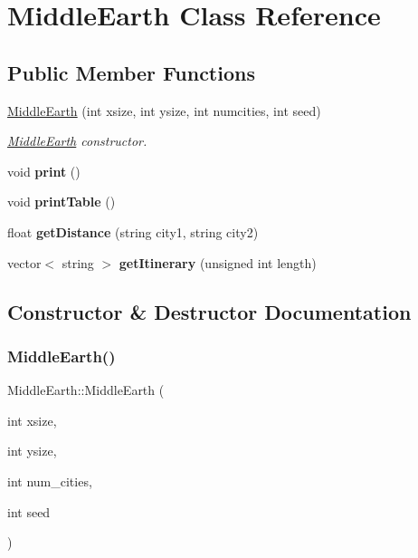 \hypertarget{class_middle_earth}{}\section{Middle\+Earth Class Reference}
\label{class_middle_earth}
\subsection*{Public Member Functions}
\begin{DoxyCompactItemize}
\item 
\hyperlink{class_middle_earth_ab7f5e0c9a33827812f435042e41e7800}{Middle\+Earth} (int xsize, int ysize, int numcities, int seed)
\begin{DoxyCompactList}\small\item\em \hyperlink{class_middle_earth}{Middle\+Earth} constructor. \end{DoxyCompactList}\item 
\hypertarget{class_middle_earth_a5cb0956acbe5e39525e5061c9f3cc79b}{}\label{class_middle_earth_a5cb0956acbe5e39525e5061c9f3cc79b} 
void {\bfseries print} ()
\item 
\hypertarget{class_middle_earth_ae724794944d0ade7854047e779eb7054}{}\label{class_middle_earth_ae724794944d0ade7854047e779eb7054} 
void {\bfseries print\+Table} ()
\item 
\hypertarget{class_middle_earth_af558c23fd240638847105737faf755a3}{}\label{class_middle_earth_af558c23fd240638847105737faf755a3} 
float {\bfseries get\+Distance} (string city1, string city2)
\item 
\hypertarget{class_middle_earth_ad730d037c3946ec1129657fc5e0cb353}{}\label{class_middle_earth_ad730d037c3946ec1129657fc5e0cb353} 
vector$<$ string $>$ {\bfseries get\+Itinerary} (unsigned int length)
\end{DoxyCompactItemize}


\subsection{Constructor \& Destructor Documentation}
\hypertarget{class_middle_earth_ab7f5e0c9a33827812f435042e41e7800}{}\label{class_middle_earth_ab7f5e0c9a33827812f435042e41e7800} 
\subsubsection{\texorpdfstring{Middle\+Earth()}{MiddleEarth()}}
{\footnotesize\ttfamily Middle\+Earth\+::\+Middle\+Earth (\begin{DoxyParamCaption}\item[{int}]{xsize,  }\item[{int}]{ysize,  }\item[{int}]{num\+\_\+cities,  }\item[{int}]{seed }\end{DoxyParamCaption})}



